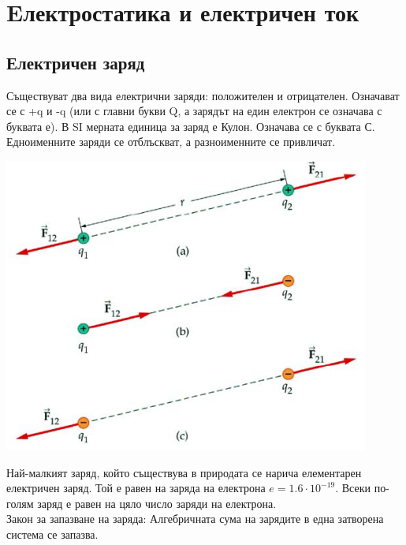 \documentclass[fleqn, 12pt]{article}
\theoremstyle{definition}
\begin{document}
\newpage
\section{Eлектростатика и електричен ток}

\subsection{Електричен заряд}
Съществуват два вида електрични заряди: положителен и отрицателен. Означават се с
+q и -q (или с главни букви Q, а зарядът на един електрон се означава с буквата е). В SI
мерната единица за заряд е Кулон. Означава се с буквата С.\\
Едноименните заряди се отблъскват, а разноименните се привличат. 

\begin{center}
  \includegraphics{Pics/physics/lec6-1.png}
\end{center}

Най-малкият заряд, който съществува в природата се нарича елементарен
електричен заряд. Той е равен на заряда на електрона $e = 1.6 \cdot 10^{-19} $. Всеки по-голям
заряд е равен на цяло число заряди на електрона.\\
Закон за запазване на заряда: Алгебричната сума на зарядите в една затворена
система се запазва. 
\end{document}
